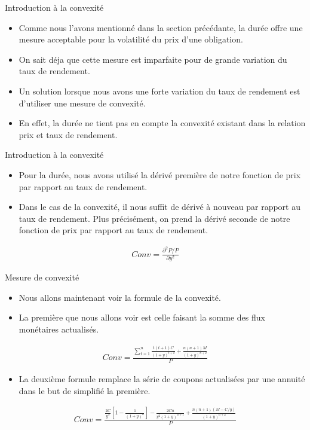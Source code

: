 \documentclass{beamer}
\begin{document}
\begin{frame}{Introduction à la convexité}
\begin{itemize}
\item Comme nous l'avons mentionné dans la section précédante, la durée offre une mesure acceptable pour la volatilité du prix d'une obligation. 
\item On sait déja que cette mesure est imparfaite pour de grande variation du taux de rendement. 
\item Un solution lorsque nous avons une forte variation du taux de rendement est d'utiliser une mesure de convexité. 
\item En effet, la durée ne tient pas en compte la convexité existant dans la relation prix et taux de rendement. 
\end{itemize}
\end{frame}


\begin{frame}{Introduction à la convexité}
\begin{itemize}
\item Pour la durée,  nous avons utilisé la dérivé première de notre fonction de prix par rapport au taux de rendement. 
\item Dans le cas de la convexité, il nous suffit de dérivé à nouveau par rapport au taux de rendement. Plus précisément,  on prend la dérivé seconde de notre fonction de prix par rapport au taux de rendement.
\end{itemize}
\begin{align*}
Conv=\frac{\partial^2P /P}{\partial y^2}
\end{align*}
\end{frame}

\begin{frame}{Mesure de convexité}
\begin{itemize}
\item Nous allons maintenant voir la formule de la convexité. 
\item La première que nous allons voir est celle faisant la somme des flux monétaires actualisés. 
\end{itemize}
\begin{align*}
Conv=\frac{\sum_{t=1}^n \frac{t(t+1)C}{(1+y)^{t+2}}+\frac{n(n+1)M}{(1+y)^{n+2}}}{P}
\end{align*}
\begin{itemize}
\item La deuxième formule remplace la série de coupons actualisées par une annuité dans le but de simplifié la première.
\end{itemize}
\begin{align*}
Conv=\frac{\frac{2C}{y^3} \left[1-\frac{1}{(1+y)^n} \right] -\frac{2Cn}{y^2(1+y)^{n+1}}+\frac{n(n+1)(M-C/y)}{(1+y)^{n+2}}}{P}
\end{align*}
\end{frame}
\end{document}
